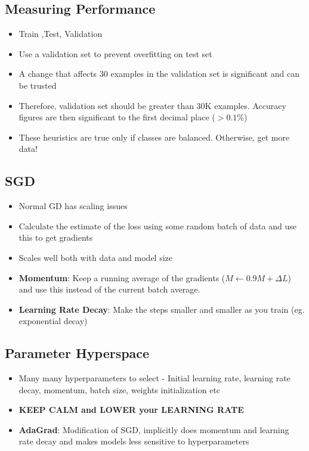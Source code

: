 \documentclass{article}
\begin{document}
\subsection{Measuring Performance}
\begin{itemize}
	\item Train ,Test, Validation
	\item Use a validation set to prevent overfitting on test set
	\item A change that affects 30 examples in the validation set is significant and can be trusted
	\item Therefore, validation set should be greater than 30K examples. Accuracy figures are then significant to the first decimal place ($ > 0.1$\%)
	\item These heuristics are true only if classes are balanced. Otherwise, get more data!
\end{itemize}

\subsection{SGD}
\begin{itemize}
	\item Normal GD has scaling issues
	\item Calculate the estimate of the loss using some random batch of data and use this to get gradients
	\item Scales well both with data and model size
	\item \textbf{Momentum}: Keep a running average of the gradients ($ M \leftarrow 0.9M + \Delta L $) and use this instead of the current batch average.
	\item \textbf{Learning Rate Decay}: Make the steps smaller and smaller as you train (eg. exponential decay)
\end{itemize}

\subsection{Parameter Hyperspace}
\begin{itemize}
	\item Many many hyperparameters to select - Initial learning rate, learning rate decay, momentum, batch size, weights initialization etc
	\item \textbf{KEEP CALM and LOWER your LEARNING RATE}
	\item \textbf{AdaGrad}: Modification of SGD, implicitly does momentum and learning rate decay and makes models less sensitive to hyperparameters
\end{itemize}
\end{document}
